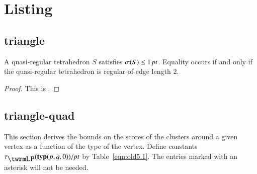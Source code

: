 



\section{Listing}

\subsection{triangle}


\begin{lemma} \label{lemma:1pt}
A quasi-regular tetrahedron $S$ satisfies $\sigma(S)\le 1\,\hbox{\it pt}$.
Equality occurs if and only if the quasi-regular tetrahedron is
regular of edge length $2$.
%
\end{lemma}

\begin{proof}
This is .
\end{proof}

\subsection{triangle-quad}



This section derives the bounds on the scores of the clusters
around a given vertex as a function of the type of the vertex.
Define constants $\tlp(\pqr{(p,q,0)})/\pt$ by Table~\ref{eqn:old5.1}.  The
entries marked with an asterisk will not be needed.

\bigskip



